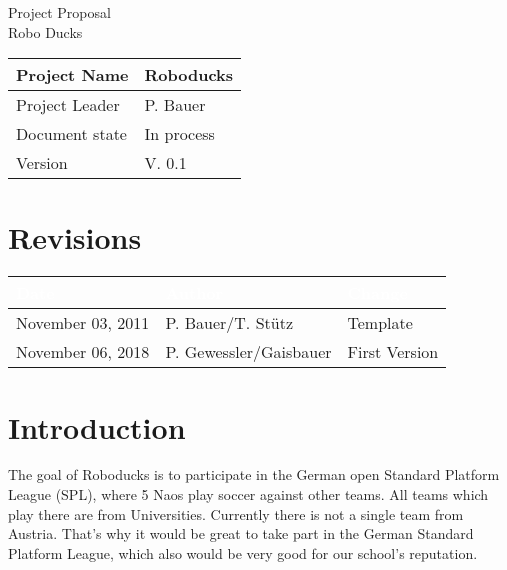 \documentclass[12pt]{article}
\theoremstyle{definition}
\newcommand{\projectname}{Roboducks}
\newcommand{\productname}{Robo Ducks}
\newcommand{\projectleader}{P. Bauer}
\newcommand{\documentstatus}{In process}
\newcommand{\version}{V. 0.1}
\begin{document}
\begin{titlepage}
\begin{flushright}

\end{flushright}

\vspace{10em}

\begin{center}
{\Huge Project Proposal} \\[3em]
{\LARGE \productname} \\[3em]
\end{center}

\begin{flushleft}
\begin{tabular}{|l|l|}
\hline
Project Name & \projectname \\ \hline
Project Leader & \projectleader \\ \hline
Document state & \documentstatus \\ \hline
Version & \version \\ \hline
\end{tabular}
\end{flushleft}

\end{titlepage}
\section*{Revisions}
\begin{tabular}{|l|l|l|}
\hline
\cellcolor[gray]{0.5}\textcolor{white}{Date} & \cellcolor[gray]{0.5}\textcolor{white}{Author} & \cellcolor[gray]{0.5}\textcolor{white}{Change} \\ \hline
November 03, 2011&P. Bauer/T. Stütz&Template \\ \hline


November 06, 2018&P. Gewessler/Gaisbauer&First Version\\ \hline
\end{tabular}
\pagebreak

\tableofcontents
\pagebreak

\section{Introduction}

The goal of Roboducks is to participate in the German open Standard Platform League (SPL), where 5 Naos play soccer against other teams. All teams which play there are from Universities. Currently there is not a single team from Austria. That's why it would be great to take part in the German Standard Platform League, which also would be very good for our school's reputation.\\
\end{document}
